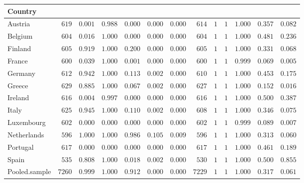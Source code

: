 \begin{table}[!tbp]
\begin{center}
\begin{tabular}{lrrrrrrrrrrrr}
\hline\hline
\multicolumn{1}{l}{Country}&\multicolumn{1}{c}{}&\multicolumn{1}{c}{}&\multicolumn{1}{c}{}&\multicolumn{1}{c}{}&\multicolumn{1}{c}{}&\multicolumn{1}{c}{}&\multicolumn{1}{c}{}&\multicolumn{1}{c}{}&\multicolumn{1}{c}{}&\multicolumn{1}{c}{}&\multicolumn{1}{c}{}&\multicolumn{1}{c}{}\tabularnewline
\hline
Austria&$ 619$&$0.001$&$0.988$&$0.000$&$0.000$&$0.000$&$ 614$&$1$&$1$&$1.000$&$0.357$&$0.082$\tabularnewline
Belgium&$ 604$&$0.016$&$1.000$&$0.000$&$0.000$&$0.000$&$ 604$&$1$&$1$&$1.000$&$0.481$&$0.236$\tabularnewline
Finland&$ 605$&$0.919$&$1.000$&$0.200$&$0.000$&$0.000$&$ 605$&$1$&$1$&$1.000$&$0.331$&$0.068$\tabularnewline
France&$ 600$&$0.039$&$1.000$&$0.001$&$0.000$&$0.000$&$ 600$&$1$&$1$&$0.999$&$0.069$&$0.005$\tabularnewline
Germany&$ 612$&$0.942$&$1.000$&$0.113$&$0.002$&$0.000$&$ 610$&$1$&$1$&$1.000$&$0.453$&$0.175$\tabularnewline
Greece&$ 629$&$0.885$&$1.000$&$0.067$&$0.002$&$0.000$&$ 627$&$1$&$1$&$1.000$&$0.152$&$0.016$\tabularnewline
Ireland&$ 616$&$0.004$&$0.997$&$0.000$&$0.000$&$0.000$&$ 616$&$1$&$1$&$1.000$&$0.500$&$0.387$\tabularnewline
Italy&$ 625$&$0.945$&$1.000$&$0.110$&$0.002$&$0.000$&$ 608$&$1$&$1$&$1.000$&$0.346$&$0.075$\tabularnewline
Luxembourg&$ 602$&$0.000$&$0.000$&$0.000$&$0.000$&$0.000$&$ 602$&$1$&$1$&$0.999$&$0.089$&$0.007$\tabularnewline
Netherlands&$ 596$&$1.000$&$1.000$&$0.986$&$0.105$&$0.009$&$ 596$&$1$&$1$&$1.000$&$0.313$&$0.060$\tabularnewline
Portugal&$ 617$&$0.000$&$0.000$&$0.000$&$0.000$&$0.000$&$ 617$&$1$&$1$&$1.000$&$0.461$&$0.189$\tabularnewline
Spain&$ 535$&$0.808$&$1.000$&$0.018$&$0.002$&$0.000$&$ 530$&$1$&$1$&$1.000$&$0.500$&$0.855$\tabularnewline
Pooled.sample&$7260$&$0.999$&$1.000$&$0.912$&$0.000$&$0.000$&$7229$&$1$&$1$&$1.000$&$0.317$&$0.061$\tabularnewline
\hline
\end{tabular}\end{center}
\end{table}
